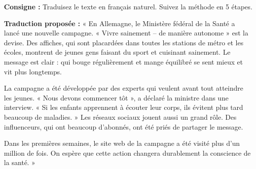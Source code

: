 \documentclass[11pt]{article}
\begin{document}
\begin{exoresolu}
\textbf{Consigne :} Traduisez le texte en français naturel. Suivez la méthode en 5 étapes.

\tcblower
\textbf{Traduction proposée :}
« En Allemagne, le Ministère fédéral de la Santé a lancé une nouvelle campagne. « Vivre sainement – de manière autonome » est la devise. Des affiches, qui sont placardées dans toutes les stations de métro et les écoles, montrent de jeunes gens faisant du sport et cuisinant sainement. Le message est clair : qui bouge régulièrement et mange équilibré se sent mieux et vit plus longtemps.

La campagne a été développée par des experts qui veulent avant tout atteindre les jeunes. « Nous devons commencer tôt », a déclaré la ministre dans une interview. « Si les enfants apprennent à écouter leur corps, ils évitent plus tard beaucoup de maladies. » Les réseaux sociaux jouent aussi un grand rôle. Des influenceurs, qui ont beaucoup d'abonnés, ont été priés de partager le message.

Dans les premières semaines, le site web de la campagne a été visité plus d'un million de fois. On espère que cette action changera durablement la conscience de la santé. »


\end{exoresolu}
\end{document}
